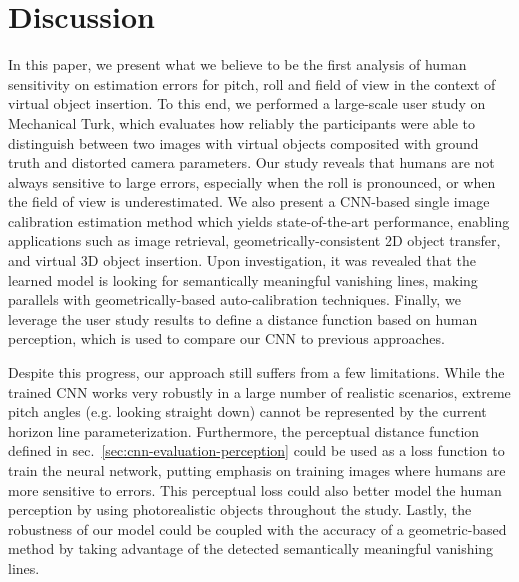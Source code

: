 
\section{Discussion}

In this paper, we present what we believe to be the first analysis of human sensitivity on estimation errors for pitch, roll and field of view in the context of virtual object insertion. To this end, we performed a large-scale user study on Mechanical Turk, which evaluates how reliably the participants were able to distinguish between two images with virtual objects composited with ground truth and distorted camera parameters.
Our study reveals that humans are not always sensitive to large errors, especially when the roll is pronounced, or when the field of view is underestimated. We also present a CNN-based single image calibration estimation method which yields state-of-the-art performance, enabling applications such as image retrieval, geometrically-consistent 2D object transfer, and virtual 3D object insertion. Upon investigation, it was revealed that the learned model is looking for semantically meaningful vanishing lines, making parallels with geometrically-based auto-calibration techniques. Finally, we leverage the user study results to define a distance function based on human perception, which is used to compare our CNN to previous approaches.

Despite this progress, our approach still suffers from a few limitations. While the trained CNN works very robustly in a large number of realistic scenarios, extreme pitch angles (e.g. looking straight down) cannot be represented by the current horizon line parameterization. Furthermore, the perceptual distance function defined in sec.~\ref{sec:cnn-evaluation-perception} could be used as a loss function to train the neural network, putting emphasis on training images where humans are more sensitive to errors. This perceptual loss could also better model the human perception by using photorealistic objects throughout the study. Lastly, the robustness of our model could be coupled with the accuracy of a geometric-based method by taking advantage of the detected semantically meaningful vanishing lines.
